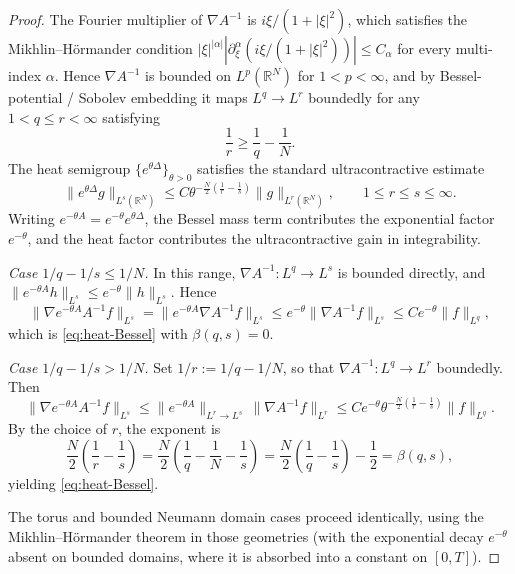 \documentclass[10pt,a4paper]{amsart}
\newcommand{\R}{\mathbb{R}}
\begin{document}
\begin{proof}
The Fourier multiplier of $\nabla A^{-1}$ is $i\xi/(1+|\xi|^{2})$, which satisfies the Mikhlin--Hörmander condition $|\xi|^{|\alpha|}|\partial_\xi^{\alpha}(i\xi/(1+|\xi|^{2}))|\le C_\alpha$ for every multi-index $\alpha$. Hence $\nabla A^{-1}$ is bounded on $L^{p}(\R^{N})$ for $1<p<\infty$, and by Bessel-potential / Sobolev embedding it maps $L^{q}\to L^{r}$ boundedly for any $1<q\le r<\infty$ satisfying
\[
        \frac{1}{r}\ge\frac{1}{q}-\frac{1}{N}.
\]
The heat semigroup $\{e^{\theta\Delta}\}_{\theta>0}$ satisfies the standard ultracontractive estimate
\[
        \|e^{\theta\Delta}g\|_{L^{s}(\R^{N})}\le C\theta^{-\frac{N}{2}(\frac{1}{r}-\frac{1}{s})}\|g\|_{L^{r}(\R^{N})},
        \qquad 1\le r\le s\le\infty.
\]
Writing $e^{-\theta A}=e^{-\theta}e^{\theta\Delta}$, the Bessel mass term contributes the exponential factor $e^{-\theta}$, and the heat factor contributes the ultracontractive gain in integrability.

\emph{Case $1/q-1/s\le 1/N$.}
In this range, $\nabla A^{-1}:L^{q}\to L^{s}$ is bounded directly, and $\|e^{-\theta A}h\|_{L^{s}}\le e^{-\theta}\|h\|_{L^{s}}$. Hence
\[
        \|\nabla e^{-\theta A}A^{-1}f\|_{L^{s}}
        =\|e^{-\theta A}\nabla A^{-1}f\|_{L^{s}}
        \le e^{-\theta}\|\nabla A^{-1}f\|_{L^{s}}
        \le Ce^{-\theta}\|f\|_{L^{q}},
\]
which is \eqref{eq:heat-Bessel} with $\beta(q,s)=0$.

\emph{Case $1/q-1/s>1/N$.}
Set $1/r:=1/q-1/N$, so that $\nabla A^{-1}:L^{q}\to L^{r}$ boundedly. Then
\[
        \|\nabla e^{-\theta A}A^{-1}f\|_{L^{s}}
        \le \|e^{-\theta A}\|_{L^{r}\to L^{s}}\,\|\nabla A^{-1}f\|_{L^{r}}
        \le Ce^{-\theta}\theta^{-\frac{N}{2}(\frac{1}{r}-\frac{1}{s})}\|f\|_{L^{q}}.
\]
By the choice of $r$, the exponent is
\[
        \frac{N}{2}\!\left(\frac{1}{r}-\frac{1}{s}\right)
        =\frac{N}{2}\!\left(\frac{1}{q}-\frac{1}{N}-\frac{1}{s}\right)
        =\frac{N}{2}\!\left(\frac{1}{q}-\frac{1}{s}\right)-\frac{1}{2}=\beta(q,s),
\]
yielding \eqref{eq:heat-Bessel}.

The torus and bounded Neumann domain cases proceed identically, using the Mikhlin--Hörmander theorem in those geometries (with the exponential decay $e^{-\theta}$ absent on bounded domains, where it is absorbed into a constant on $[0,T]$).
\end{proof}
\end{document}
